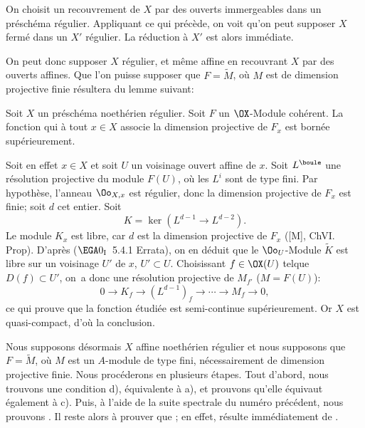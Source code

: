 On choisit un recouvrement de $X$ par des ouverts immergeables dans un pr\'esch\'ema r\'egulier. Appliquant ce qui pr\'ec\`ede, on voit qu'on peut supposer $X$ ferm\'e dans un $X'$ r\'egulier. La r\'eduction \`a $X'$ est alors imm\'ediate.

On peut donc supposer $X$ r\'egulier, et m\^eme affine en recouvrant $X$ par des ouverts affines. Que l'on puisse supposer que $F=\widetilde{M}$, o\`u $M$ est de dimension projective finie r\'esultera du lemme suivant:

\begin{lemme} \label{VIII.2.4}
Soit $X$ un pr\'esch\'ema noeth\'erien r\'egulier. Soit $F$ un $\OX$-Module coh\'erent. La fonction qui \`a tout $x\in X$ associe la dimension projective de $F_x$ est born\'ee sup\'erieurement.
\end{lemme}

\setcounter{equation}{1}

Soit en effet $x\in X$ et soit $U$ un voisinage ouvert affine de $x$. Soit $L^\boule$ une r\'esolution projective du module $F(U)$, o\`u les $L^i$ sont de type fini. Par hypoth\`ese, l'anneau $\Oo_{X, x}$ est r\'egulier, donc la dimension projective de $F_x$ est finie; soit $d$ cet entier. Soit
\[
K=\ker(L^{d-1}\to L^{d-2}).
\]
Le module $K_x$ est libre, car $d$ est la dimension projective de $F_x$ ([M], Ch\ptbl VI. Prop). D'apr\`es ($\EGA 0_{\textup{I}}$~5.4.1 Errata), on en d\'eduit que le $\Oo_U$-Module $\widetilde{K}$ est libre sur un voisinage $U'$ de $x$, $U'\subset U$. Choisissant $f\in \OX(U)$ tel\pageoriginale que $D(f)\subset U'$, on~a donc une r\'esolution projective de $M_{f'}$ ($M=F(U)$):
\[0\to K_f \to (L^{d-1})_f\to \cdots \to M_f\to 0, \]
ce qui prouve que la fonction \'etudi\'ee est semi-continue sup\'erieurement. Or $X$ est quasi-compact, d'o\`u la conclusion.

Nous supposons d\'esormais $X$ affine noeth\'erien r\'egulier et nous supposons que \hbox{$F=\widetilde{M}$}, o\`u $M$ est un $A$-module de type fini, n\'ecessairement de dimension projective finie. Nous proc\'ederons en plusieurs \'etapes. Tout d'abord, nous trouvons une condition d), \'equivalente \`a a), et prouvons qu'elle \'equivaut \'egalement \`a c). Puis, \`a l'aide de la suite spectrale du num\'ero pr\'ec\'edent, nous prouvons \ALORS{}. Il reste alors \`a prouver que \ALORS{}; en effet, \SSI{}\ALORS{} r\'esulte imm\'ediatement de \SSI{}\ALORS{}.

